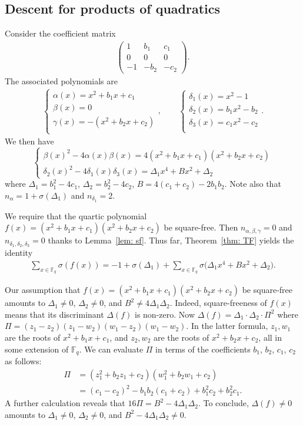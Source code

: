 \documentclass[11pt]{amsart}
\newcommand{\F}{\mathbb{F}}
\newcommand{\Fq}{\F_{\!q}}
\theoremstyle{definition}
\begin{document}
\subsection{Descent for products of quadratics}
Consider the coefficient matrix 
\begin{align*}
\begin{pmatrix}
1 & b_1 & c_1\\
0 & 0 & 0\\
-1 & -b_2 &-c_2
\end{pmatrix}.
\end{align*}
The associated polynomials are
\begin{align*}
\begin{cases}
\alpha(x)=x^2+b_1x+c_1\\
\beta(x)=0\\
\gamma(x) =-(x^2+b_2x+c_2)\\
\end{cases},\qquad 
\begin{cases}
\delta_1(x)=x^2-1\\
\delta_2(x)=b_1x^2-b_2\\
\delta_3(x)=c_1x^2-c_2\\
\end{cases}.
\end{align*}
We then have 
\[\begin{cases}
\beta(x)^2-4\alpha(x)\beta(x) =4(x^2+b_1x+c_1)(x^2+b_2x+c_2)\\
\delta_2(x)^2-4\delta_1(x)\delta_3(x)=\Delta_1x^4+Bx^2+\Delta_2
\end{cases}\]
where $\Delta_1=b_1^2-4c_1$, $\Delta_2=b_2^2-4c_2$, $B=4(c_1+c_2)-2b_1b_2$. Note also that $n_\alpha=1+\sigma(\Delta_1)$ and $n_{\delta_1}=2$. 

We require that the quartic polynomial $f(x)=(x^2+b_1x+c_1)(x^2+b_2x+c_2)$ be square-free. Then $n_{\alpha,\beta,\gamma}=0$ and $n_{\delta_1,\delta_2,\delta_3}=0$ thanks to Lemma~\ref{lem: sf}. Thus far, Theorem~\ref{thm: TF} yields the identity
\begin{align}\label{eq: a31}
\sum_{x\in \Fq} \sigma(f(x))=-1+\sigma(\Delta_1)+\sum_{x\in \Fq} \sigma\big(\Delta_1x^4+Bx^2+\Delta_2\big).
\end{align}

Our assumption that $f(x)=(x^2+b_1x+c_1)(x^2+b_2x+c_2)$ be square-free amounts to $\Delta_1\neq 0$, $\Delta_2\neq 0$, and $B^2\neq 4\Delta_1\Delta_2$. Indeed, square-freeness of $f(x)$ means that its discriminant $\Delta(f)$ is non-zero. Now $\Delta(f)=\Delta_1\cdot \Delta_2\cdot \Pi^2$ where $\Pi=(z_1-z_2)(z_1-w_2)(w_1-z_2)(w_1-w_2)$. In the latter formula, $z_1,w_1$ are the roots of $x^2+b_1x+c_1$, and $z_2,w_2$ are the roots of $x^2+b_2x+c_2$, all in some extension of $\Fq$. We can evaluate $\Pi$ in terms of the coefficients $b_1$, $b_2$, $c_1$, $c_2$ as follows: 
\begin{align*}
\Pi&=(z_1^2+b_2z_1+c_2)(w_1^2+b_2w_1+c_2)\\
&=(c_1-c_2)^2-b_1b_2(c_1+c_2)+b_1^2c_2+b_2^2c_1.
\end{align*}
A further calculation reveals that $16\Pi=B^2-4\Delta_1\Delta_2$. To conclude, $\Delta(f)\neq 0$ amounts to $\Delta_1\neq 0$, $\Delta_2\neq 0$, and $B^2-4\Delta_1\Delta_2\neq 0$. 
\end{document}
